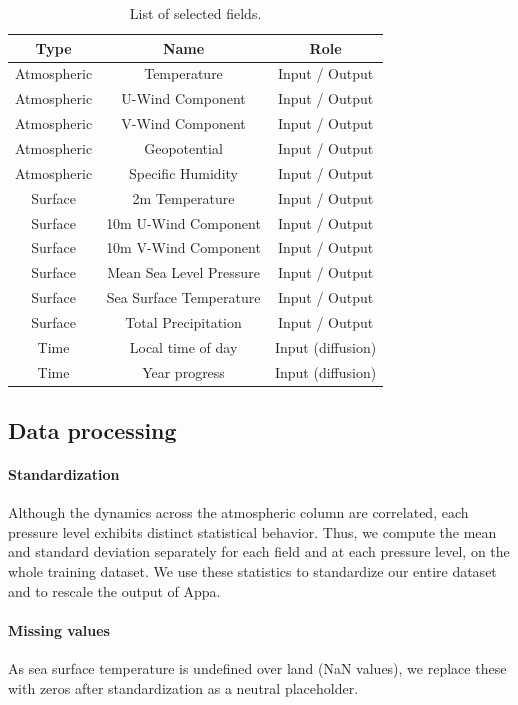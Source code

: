 \begin{subappendices}
\begin{table}[h]
\centering
\caption{List of selected fields.}
\label{tab:data-era5-fields}
\begin{tabular}{ccc}
\toprule
\textbf{Type} & \textbf{Name} & \textbf{Role} \\
\midrule
Atmospheric & Temperature & Input / Output \\
Atmospheric & U-Wind Component & Input / Output \\
Atmospheric & V-Wind Component & Input / Output \\
Atmospheric & Geopotential & Input / Output \\
Atmospheric & Specific Humidity & Input / Output \\
Surface & 2m Temperature & Input / Output \\
Surface & 10m U-Wind Component & Input / Output \\
Surface & 10m V-Wind Component & Input / Output \\
Surface & Mean Sea Level Pressure & Input / Output \\
Surface & Sea Surface Temperature & Input / Output \\
Surface & Total Precipitation & Input / Output \\
\midrule
Time & Local time of day & Input (diffusion)\\
Time & Year progress & Input (diffusion)\\
\bottomrule
\end{tabular}
\end{table}

\subsection{Data processing}

\paragraph{Standardization} Although the dynamics across the atmospheric column are correlated, each pressure level exhibits distinct statistical behavior. Thus, we compute the mean and standard deviation separately for each field and at each pressure level, on the whole training dataset. We use these statistics to standardize our entire dataset and to rescale the output of Appa.

\paragraph{Missing values}
As sea surface temperature is undefined over land (NaN values), we replace these with zeros after standardization as a neutral placeholder.


\end{subappendices}
